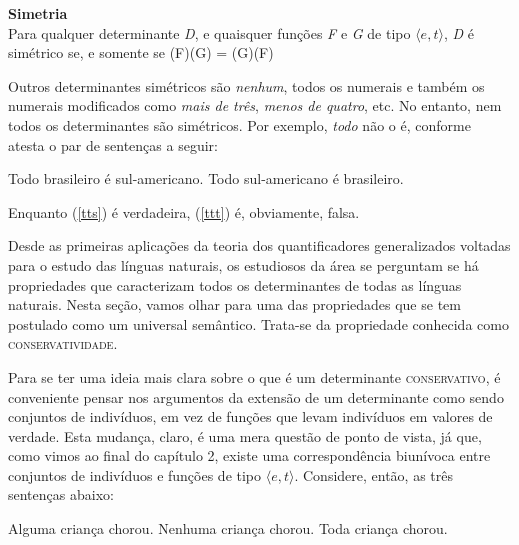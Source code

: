 \begin{tcolorbox}[boxrule=0pt,sharp corners]

\n \textbf{Simetria}\\
\n Para qualquer determinante \textit{D}, e quaisquer funções \textit{F} e \textit{G} de
tipo $\langle e,t\rangle$, \textit{D} é
simétrico se, e somente se (F)(G) = (G)(F)

\end{tcolorbox}

\bigskip

\n Outros determinantes simétricos são \textit{nenhum}, todos os
numerais e também os numerais modificados como \textit{mais de
três}, \textit{menos de quatro}, etc. No entanto, nem todos os
determinantes são simétricos. Por exemplo, \textit{todo} não o é,
conforme atesta o par de sentenças a seguir:


\begin{exe}
    \ex\label{tt}
    \begin{xlist}
        \ex  Todo brasileiro é sul-americano.\label{tts}
        \ex  Todo sul-americano é brasileiro.\label{ttt}
    \end{xlist}
\end{exe}

\n Enquanto (\ref{tts}) é verdadeira, (\ref{ttt}) é, obviamente,
falsa.

Desde as primeiras aplicações da teoria dos quantificadores
generalizados voltadas para o estudo das línguas naturais, os
estudiosos da área se perguntam se há propriedades que
caracterizam todos os determinantes de todas as línguas naturais. Nesta seção, vamos olhar para uma das propriedades que se tem
postulado como um universal semântico. Trata-se da propriedade
conhecida como \textsc{conservatividade}.

Para se ter uma ideia mais clara sobre o que é um determinante
\textsc{conservativo}, é conveniente pensar nos argumentos da
extensão de um determinante como sendo conjuntos de indivíduos, em vez de funções que levam indivíduos em valores de verdade. Esta
mudança, claro, é uma mera questão de ponto de vista, já que, como
vimos ao final do capítulo 2, existe uma correspondência biunívoca
entre conjuntos de indivíduos e funções de tipo $\langle
e,t\rangle$. Considere, então, as três sentenças abaixo:

\begin{exe}
    \ex Alguma criança chorou. \label{rec}
    \ex Nenhuma criança chorou. \label{red}
    \ex Toda criança chorou. \label{ree}
\end{exe}

